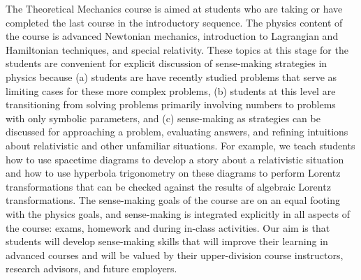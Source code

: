 \documentclass[english,aps,pra,reprint,noshowpacs,superscriptaddress]{revtex4-1}
\begin{document}
The Theoretical Mechanics course is aimed at students who are taking
or have completed the last course in the introductory sequence. The
physics content of the course is advanced Newtonian mechanics,
introduction to Lagrangian and Hamiltonian techniques, and special
relativity. These topics at this stage for the students are convenient
for explicit discussion of sense-making strategies in physics because
(a) students are have recently studied problems that serve as limiting
cases for these more complex problems, (b) students at this level are
transitioning from solving problems primarily involving numbers to
problems with only symbolic parameters, and (c) sense-making as strategies 
can be discussed for approaching a problem, evaluating
answers, and refining intuitions about relativistic and other
unfamiliar situations. For example, we teach students how to use
spacetime diagrams to develop a story about a relativistic situation
and how to use hyperbola trigonometry on these diagrams to perform Lorentz
transformations that can be checked against the results of algebraic
Lorentz transformations.  The sense-making goals of the course are on
an equal footing with the physics goals, and sense-making is integrated
explicitly in all aspects of the course: exams, homework and during
in-class activities. Our aim is that students will develop
sense-making skills that will improve their learning in advanced
courses and will be valued by their upper-division course instructors,
research advisors, and future employers.

\end{document}

